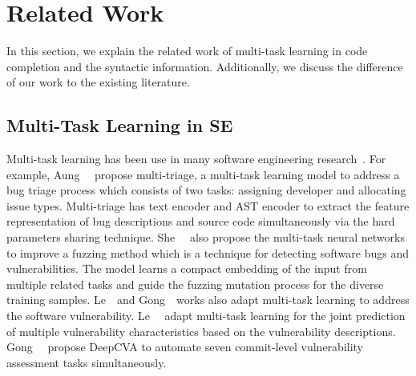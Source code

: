 \section{Related Work}
\label{sec:relatedwork}

In this section, we explain the related work of multi-task learning in code completion and the syntactic information. Additionally, we discuss the difference of our work to the existing literature.





\subsection{Multi-Task Learning in SE}




Multi-task learning has been use in many software engineering research~\cite{aung2022multi,she2020mtfuzz, le2021deepcva,8882756}.
For example, Aung~\ea~\cite{aung2022multi} propose multi-triage, a multi-task learning model to address a bug triage process which consists of two tasks: assigning developer and allocating issue types.
Multi-triage has text encoder and AST encoder to extract the feature representation of bug descriptions and source code simultaneously via the hard parameters sharing technique.
She~\ea~\cite{she2020mtfuzz} also propose the multi-task neural networks to improve a fuzzing method which is a technique for detecting software bugs and vulnerabilities.
The model learns a compact embedding of the input from multiple related tasks and guide the fuzzing mutation process for the diverse training samples.
Le~\ea~and Gong~\ea~works also adapt multi-task learning to address the  software vulnerability.
Le~\ea~\cite{le2021deepcva} adapt multi-task learning for the joint prediction of multiple vulnerability characteristics based on the vulnerability descriptions.
Gong~\ea~\cite{8882756} propose DeepCVA to automate seven commit-level vulnerability assessment tasks simultaneously.

